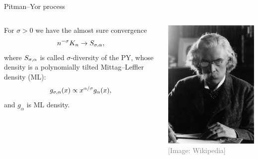 \begin{frame}[allowframebreaks]{Pitman--Yor process}
\begin{columns}
\begin{proposition}
For $\sigma >0$ we have the almost sure convergence 
$$
n^{-\sigma}K_n\rightarrow S_{\sigma, \alpha},
$$
where $ S_{\sigma, \alpha}$ is called $\sigma$-diversity of the PY, whose density is a polynomially tilted \alert{Mittag--Leffler density} (ML):
\begin{equation*}
    g_{\sigma,\alpha}(x)\propto x^{\alpha/\sigma}g_\alpha (x),
\end{equation*}
and $g_\alpha$ is ML density.
\end{proposition}
\includegraphics[width=\textwidth]{figures_julyan/trombi/Mittag-Leffler}
		\hfill\textcolor{gray}{[Image: Wikipedia]}
\end{columns}




\framebreak


\end{frame}

